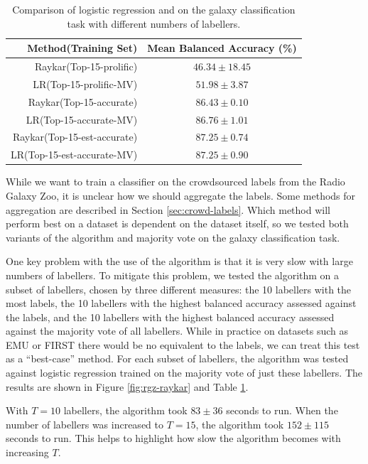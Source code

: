  \begin{table}
    \centering
    \begin{tabular}{r|c}
      \textbf{Method(Training Set)} & \textbf{Mean Balanced Accuracy (\%)}\\\hline
      Raykar(Top-15-prolific) & $46.34 \pm 18.45$\\
      LR(Top-15-prolific-MV) & $51.98 \pm 3.87$\\
      Raykar(Top-15-accurate) & $86.43 \pm 0.10$\\
      LR(Top-15-accurate-MV) & $86.76 \pm 1.01$\\
      Raykar(Top-15-est-accurate) & $87.25 \pm 0.74$\\
      LR(Top-15-est-accurate-MV) & $87.25 \pm 0.90$\\
    \end{tabular}
    \caption{Comparison of logistic regression and \citeauthor{raykar10} on the
      galaxy classification task with different numbers of labellers.}
    \label{tab:rgz-raykar}
  \end{table}

  While we want to train a classifier on the crowdsourced labels from the Radio
  Galaxy Zoo, it is unclear how we should aggregate the labels. Some methods for
  aggregation are described in Section \ref{sec:crowd-labels}. Which method will
  perform best on a dataset is dependent on the dataset itself, so we tested
  both variants of the \citeauthor{raykar10} algorithm and majority vote on the
  galaxy classification task.

  One key problem with the use of the \citeauthor{raykar10} algorithm is that it
  is very slow with large numbers of labellers. To mitigate this problem, we
  tested the algorithm on a subset of labellers, chosen by three different
  measures: the 10 labellers with the most labels, the 10 labellers with the
  highest balanced accuracy assessed against the \citeauthor{norris06} labels,
  and the 10 labellers with the highest balanced accuracy assessed against the
  majority vote of all labellers. While in practice on datasets such as EMU or
  FIRST there would be no equivalent to the \citeauthor{norris06} labels, we can
  treat this test as a ``best-case'' method. For each subset of labellers, the
  \citeauthor{raykar10} algorithm was tested against logistic regression trained
  on the majority vote of just these labellers. The results are shown in Figure
  \ref{fig:rgz-raykar} and Table \ref{tab:rgz-raykar}.

  With $T = 10$ labellers, the \citeauthor{raykar10} algorithm took $83 \pm 36$
  seconds to run. When the number of labellers was increased to $T = 15$, the
  \citeauthor{raykar10} algorithm took $152 \pm 115$ seconds to run. This helps
  to highlight how slow the algorithm becomes with increasing $T$.

